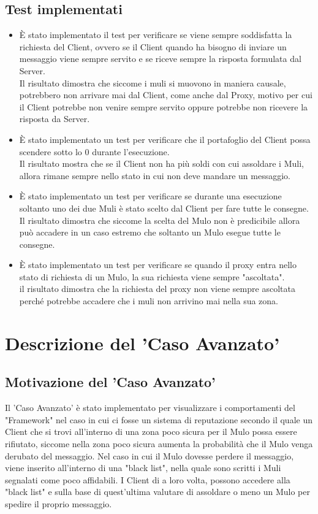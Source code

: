 \documentclass[13pt,a4paper]{article}
\begin{document}
\subsection{Test implementati}
\begin{itemize}
	\item È stato implementato il test per verificare se viene sempre soddisfatta la richiesta del Client, ovvero se il Client quando ha bisogno di inviare un messaggio viene sempre servito e se riceve sempre la risposta formulata dal Server.\\
	Il risultato dimostra che siccome i muli si muovono in maniera causale, potrebbero non arrivare mai dal Client, come anche dal Proxy, motivo per cui il Client potrebbe non venire sempre servito oppure potrebbe non ricevere la risposta da Server.
	\item È stato implementato un test per verificare che il portafoglio del Client possa scendere sotto lo 0 durante l'esecuzione.\\
	Il risultato mostra che se il Client non ha più soldi con cui assoldare i Muli, allora rimane sempre nello stato in cui non deve mandare un messaggio.
	\item È stato implementato un test per verificare se durante una esecuzione soltanto uno dei due Muli è stato scelto dal Client per fare tutte le consegne.\\
	Il risultato dimostra che siccome la scelta del Mulo non è predicibile allora può accadere in un caso estremo che soltanto un Mulo esegue tutte le consegne.
	\item È stato implementato un test per verificare se quando il proxy entra nello stato di richiesta di un Mulo, la sua richiesta viene sempre "ascoltata".\\
	il risultato dimostra che la richiesta del proxy non viene sempre ascoltata perché potrebbe accadere che i muli non arrivino mai nella sua zona.
\end{itemize}

\section{Descrizione del 'Caso Avanzato'}
\subsection{Motivazione del 'Caso  Avanzato'} 
Il 'Caso Avanzato' è stato implementato per visualizzare i comportamenti del "Framework" nel caso in cui ci fosse un sistema di reputazione secondo il quale un Client che si trovi all'interno di una zona poco sicura per il Mulo possa essere rifiutato, siccome nella zona poco sicura aumenta la probabilità che il Mulo venga derubato del messaggio. Nel caso in cui il Mulo dovesse perdere il messaggio, viene inserito all'interno di una "black list", nella quale sono scritti i Muli segnalati come poco affidabili. I Client di a loro volta,  possono accedere alla "black list" e sulla base di quest'ultima valutare di assoldare o meno un Mulo per spedire il proprio messaggio.
\end{document}
